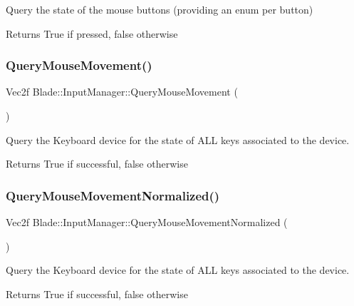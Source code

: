 Query the state of the mouse buttons (providing an enum per button) 

\begin{DoxyReturn}{Returns}
True if pressed, false otherwise 
\end{DoxyReturn}
\mbox{\label{class_blade_1_1_input_manager_ab1fe795118afeb4642342567d3e27b3f}} 
\subsubsection{\texorpdfstring{Query\+Mouse\+Movement()}{QueryMouseMovement()}}
{\footnotesize\ttfamily Vec2f Blade\+::\+Input\+Manager\+::\+Query\+Mouse\+Movement (\begin{DoxyParamCaption}{ }\end{DoxyParamCaption})}



Query the Keyboard device for the state of A\+LL keys associated to the device. 

\begin{DoxyReturn}{Returns}
True if successful, false otherwise 
\end{DoxyReturn}
\mbox{\label{class_blade_1_1_input_manager_aa96a587de7ed5234b2b7883df48c0a09}} 
\subsubsection{\texorpdfstring{Query\+Mouse\+Movement\+Normalized()}{QueryMouseMovementNormalized()}}
{\footnotesize\ttfamily Vec2f Blade\+::\+Input\+Manager\+::\+Query\+Mouse\+Movement\+Normalized (\begin{DoxyParamCaption}{ }\end{DoxyParamCaption})}



Query the Keyboard device for the state of A\+LL keys associated to the device. 

\begin{DoxyReturn}{Returns}
True if successful, false otherwise 
\end{DoxyReturn}
\mbox{\label{class_blade_1_1_input_manager_a0bd64dfa38174d3fa87c445ee261d8c3}} 
